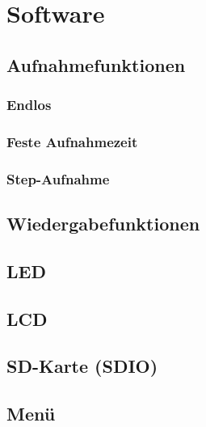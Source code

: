 \newpage
\section{Software}






\subsection{Aufnahmefunktionen}
\subsubsection{Endlos}
\subsubsection{Feste Aufnahmezeit}
\subsubsection{Step-Aufnahme}
\subsection{Wiedergabefunktionen}
\subsection{LED}
\subsection{LCD}
\subsection{SD-Karte (SDIO)}
\subsection{Menü}